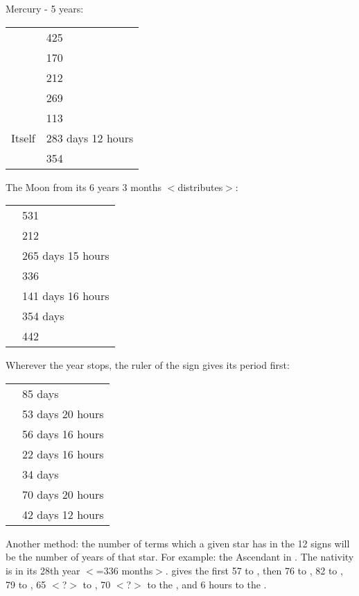 Mercury - 5 years:
\begin{center}
\begin{tabular}{cl}
\Saturn		& 425 \\
\Jupiter		& 170 \\
\Mars 		& 212 \\
\Sun 			& 269 \\
\Venus 		& 113 \\
Itself		& 283 days 12 hours \\
\Moon			& 354 \\
\end{tabular}
\end{center}
\newpage

The Moon from its 6 years 3 months $<$distributes$>$:
\begin{center}
\begin{tabular}{cl}
\Saturn		& 531 \\
\Jupiter		& 212 \\
\Mars 		& 265 days 15 hours \\
\Sun 			& 336 \\
\Venus 		& 141 days 16 hours \\
\Mercury		& 354 days \\
\Moon			&  442 \\
\end{tabular}
\end{center}

Wherever the year stops, the ruler of the sign gives its period first:
\begin{center}
\begin{tabular}{cl}
\Saturn		& 85 days \\
\Sun 			& 53 days 20 hours \\
\Mercury		& 56 days 16 hours \\
\Venus 		& 22 days 16 hours \\
\Jupiter		& 34 days \\
\Moon 		& 70 days 20 hours \\
\Mars 		& 42 days 12 hours \\
\end{tabular}
\end{center}

Another method: the number of terms which a given star has in the 12 signs will be the number of years of that star. For example: the Ascendant in \Libra. The nativity is in its 28th year $<$=336 months$>$. \Capricorn\xspace gives the first 57 to \Saturn, then 76 to \Mercury, 82 to \Venus, 79 to \Jupiter, 65 $<$?$>$ to \Mars, 70
$<$?$>$ to the \Moon, and 6 hours to the \Sun.

